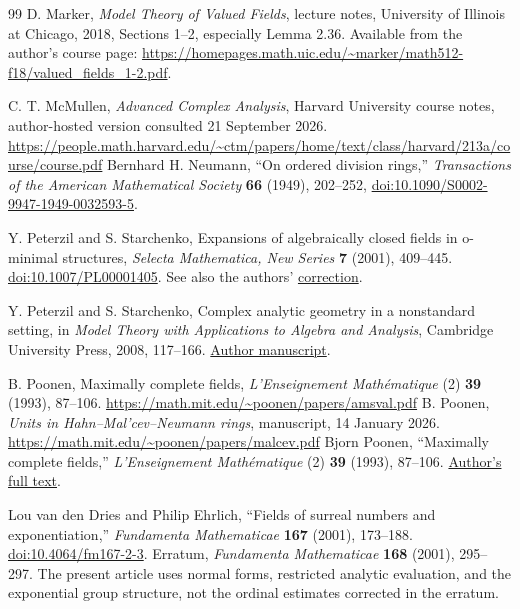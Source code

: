 \documentclass[11pt,a4paper]{article}
\numberwithin{equation}{section}
\theoremstyle{definition}
\theoremstyle{remark}
\theoremstyle{plain}
\begin{document}
\begin{thebibliography}{99}
D. Marker, \emph{Model Theory of Valued Fields}, lecture notes, University of Illinois at Chicago, 2018, Sections 1--2, especially Lemma 2.36. Available from the author's course page: \url{https://homepages.math.uic.edu/~marker/math512-f18/valued_fields_1-2.pdf}.

C. T. McMullen, \emph{Advanced Complex Analysis}, Harvard University course notes, author-hosted version consulted 21 September 2026. \url{https://people.math.harvard.edu/~ctm/papers/home/text/class/harvard/213a/course/course.pdf}
Bernhard H. Neumann, ``On ordered division rings,'' \emph{Transactions of the American Mathematical Society} \textbf{66} (1949), 202--252, \href{https://doi.org/10.1090/S0002-9947-1949-0032593-5} {doi:10.1090/S0002-9947-1949-0032593-5}.

Y. Peterzil and S. Starchenko, Expansions of algebraically closed fields in o-minimal structures, \emph{Selecta Mathematica, New Series} \textbf{7} (2001), 409--445. \href{https://doi.org/10.1007/PL00001405}{doi:10.1007/PL00001405}. See also the authors' \href{https://math.haifa.ac.il/kobi/Correction.pdf}{correction}.

Y. Peterzil and S. Starchenko, Complex analytic geometry in a nonstandard setting, in \emph{Model Theory with Applications to Algebra and Analysis}, Cambridge University Press, 2008, 117--166. \href{https://math.haifa.ac.il/kobi/Newton.pdf}{Author manuscript}.

B. Poonen, Maximally complete fields, \emph{L'Enseignement Math\'ematique} (2) \textbf{39} (1993), 87--106. \url{https://math.mit.edu/~poonen/papers/amsval.pdf}
B. Poonen, \emph{Units in Hahn--Mal'cev--Neumann rings}, manuscript, 14 January 2026. \url{https://math.mit.edu/~poonen/papers/malcev.pdf}
Bjorn Poonen, ``Maximally complete fields,'' \emph{L'Enseignement Math\'ematique} (2) \textbf{39} (1993), 87--106. \href{https://math.mit.edu/~poonen/papers/amsval.pdf}{Author's full text}.

Lou van den Dries and Philip Ehrlich, ``Fields of surreal numbers and exponentiation,'' \emph{Fundamenta Mathematicae} \textbf{167} (2001), 173--188. \href{https://doi.org/10.4064/fm167-2-3}{doi:10.4064/fm167-2-3}. Erratum, \emph{Fundamenta Mathematicae} \textbf{168} (2001), 295--297. The present article uses normal forms, restricted analytic evaluation, and the exponential group structure, not the ordinal estimates corrected in the erratum.


\end{thebibliography}
\end{document}
